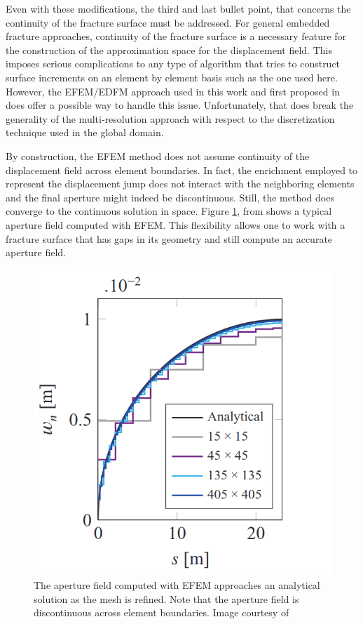 Even with these modifications, the third and last bullet point, that concerns the continuity of the fracture surface must be addressed. For general embedded fracture approaches, continuity of the fracture surface is a necessary feature for the construction of the approximation space for the displacement field. This imposes serious complications to any type of algorithm that tries to construct surface increments on an element by element basis such as the one used here. However, the EFEM/EDFM approach used in this work and first proposed in \cite{cusini2021simulation} does offer a possible way to handle this issue. Unfortunately, that does break the generality of the multi-resolution approach with respect to the discretization technique used in the global domain. 

By construction, the EFEM method does not assume continuity of the displacement field across element boundaries. In fact, the enrichment employed to represent the displacement jump does not interact with the neighboring elements and the final aperture might indeed be discontinuous. Still, the method does converge to the continuous solution in space. Figure \ref{fig:efem_apertures}, from \cite{cusini2021simulation} shows a typical aperture field computed with EFEM. This flexibility allows one to work with a fracture surface that has gaps in its geometry and still compute an accurate aperture field. 

\begin{figure}[h]
    \centering
    \includegraphics[width=0.5\linewidth]{Chapter4/figures/nonplanar/efem_aperture.png}
    \caption{The aperture field computed with EFEM approaches an analytical solution as the mesh is refined. Note that the aperture field is discontinuous across element boundaries. Image courtesy of  \cite{cusini2021simulation}}
    \label{fig:efem_apertures}
\end{figure}

